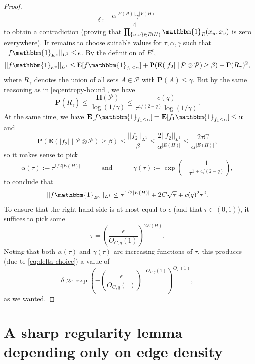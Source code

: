 \documentclass[reqno,11pt]{amsart}
\theoremstyle{definition}
\theoremstyle{remark}
\numberwithin{equation}{section}
\renewcommand{\P}{\mathbf{P}}
\renewcommand{\H}{\mathbf{H}}
\newcommand{\E}{\mathbf{E}}
\newcommand{\mP}{\mathcal{P}}
\newcommand{\one}{\mathbbm{1}}
\begin{document}
\begin{proof}
\begin{equation}
    \delta := \frac{\alpha^{|E(H)|} \gamma^{|V(H)|}}{4}
\end{equation}
to obtain a contradiction (proving that $\prod_{\{u, v\} \in E(H)} \one_E(x_u, x_v)$ is zero everywhere). It remains to choose suitable values for $\tau, \alpha, \gamma$ such that $||f \one_{E^c}||_{L^1} \le \epsilon$. By the definition of $E^c$,
\[
    ||f \one_{E^c}||_{L^1}
    \le
    \E[f \one_{f_1 \le \alpha}]
    +
    \P(\E(|f_2| \mid \mP \otimes \mP) \ge \beta)
    +
    \P(R_\gamma)^2,
\]
where $R_\gamma$ denotes the union of all sets $A \in \mP$ with $\P(A) \le \gamma$. But by the same reasoning as in \cref{eq:entropy-bound}, we have
\[
    \P(R_\gamma) \le \frac{\H(\mP)}{\log(1/\gamma)}
    \le 
    \frac{c(q)}{\tau^{4/(2-q)} \log(1/\gamma)}.
\]
At the same time, we have $\E[f \one_{f_1 \le \alpha}] = \E[f_1 \one_{f_1 \le \alpha}] \le \alpha$ and
\[
    \P(\E(|f_2| \mid \mP \otimes \mP) \ge \beta)
    \le 
    \frac{||f_2||_{L^1}}{\beta} 
    \le 
    \frac{2||f_2||_{L^2}}{\alpha^{|E(H)|}}
    \le 
    \frac{2\tau C}{\alpha^{|E(H)|}},
\]
so it makes sense to pick 
\[
    \alpha(\tau) := \tau^{1/2|E(H)|}
    \qquad\quad 
    \text{and} 
    \qquad\quad 
    \gamma(\tau) := \exp \left( - \frac{1}{\tau^{1+4/(2-q)}} \right),
\]
to conclude that 
\[
    ||f\one_{E^c}||_{L^1} 
    \le 
    \tau^{1/2|E(H)|} + 2C \sqrt{\tau} + 
    c(q)^2 \tau^2.
\]
To ensure that the right-hand side is at most equal to $\epsilon$ (and that $\tau \in (0, 1)$), it suffices to pick some
\[
    \tau = \left(\frac{\epsilon}{O_{C,q}(1)}\right)^{2 E(H)}.
\]
Noting that both $\alpha(\tau)$ and $\gamma(\tau)$ are increasing functions of $\tau$, this produces (due to \cref{eq:delta-choice}) a value of
\[
    \delta 
    \gg 
    \exp \left(- \left(\frac{\epsilon}{O_{C,q}(1)}\right)^{-O_{H,q}(1)} \right)^{O_H(1)},
\]
as we wanted.
\end{proof}





\section{A sharp regularity lemma depending only on edge density}
\label{sec:sharp-regularity}

\end{document}
